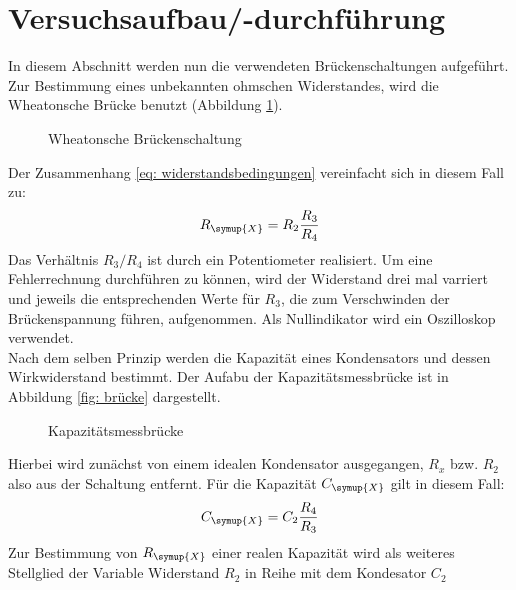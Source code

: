 \section{Versuchsaufbau/-durchführung}
In diesem Abschnitt werden nun die verwendeten Brückenschaltungen aufgeführt. \\
Zur Bestimmung eines unbekannten ohmschen Widerstandes, wird die Wheatonsche Brücke
benutzt (Abbildung \ref{fig: wheaton}).
\begin{figure}
  \centering
  \caption{Wheatonsche Brückenschaltung\cite{anleitung302}}
  \label{fig: wheaton}
\end{figure}
Der Zusammenhang \eqref{eq: widerstandsbedingungen} vereinfacht sich in diesem Fall zu:
\begin{equation}
  R_{\symup{X}} = R_2 \frac{R_3}{R_4}
\end{equation}
Das Verhältnis $R_3 / R_4$ ist durch ein Potentiometer realisiert. Um eine Fehlerrechnung durchführen
zu können, wird der Widerstand drei mal varriert und jeweils die entsprechenden Werte für $R_3$, die
zum Verschwinden der Brückenspannung führen, aufgenommen. Als Nullindikator wird ein Oszilloskop verwendet. \\
Nach dem selben Prinzip werden die Kapazität eines Kondensators und dessen Wirkwiderstand bestimmt. Der Aufabu
der Kapazitätsmessbrücke ist in Abbildung \ref{fig: brücke} dargestellt.
\begin{figure}
  \centering
  \caption{Kapazitätsmessbrücke\cite{anleitung302}}
  \label{fig: kapazität}
\end{figure}
Hierbei wird zunächst von einem idealen Kondensator ausgegangen, $R_x$ bzw. $R_2$ also aus der Schaltung entfernt. Für die
Kapazität $C_{\symup{X}}$ gilt in diesem Fall:
\begin{equation}
  C_{\symup{X}} = C_2 \frac{R_4}{R_3}
  \label{eq: Cx}
\end{equation}
Zur Bestimmung von $R_{\symup{X}}$ einer realen Kapazität wird als weiteres Stellglied der Variable Widerstand $R_2$ in Reihe mit dem Kondesator $C_2$
